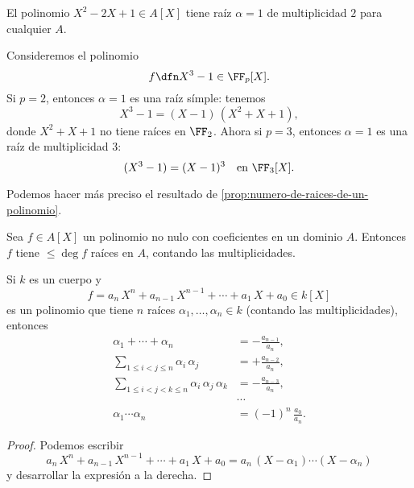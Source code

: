 \begin{ejemplo}
  El polinomio $X^2 - 2X + 1 \in A [X]$ tiene raíz $\alpha = 1$ de multiplicidad
  $2$ para cualquier $A$.
\end{ejemplo}

\begin{ejemplo}
  \label{ejemplo:X3-1}
  Consideremos el polinomio
  $$f \dfn X^3 - 1 \in \FF_p [X].$$
  Si $p = 2$, entonces $\alpha = 1$ es una raíz símple: tenemos
  $$X^3 - 1 = (X - 1)\,(X^2 + X + 1),$$
  donde $X^2 + X + 1$ no tiene raíces en $\FF_2$. Ahora si $p = 3$, entonces
  $\alpha = 1$ es una raíz de multiplicidad $3$:
  \[ (X^3 - 1) = (X-1)^3 \quad\text{en }\FF_3 [X]. \qedhere \]
\end{ejemplo}

Podemos hacer más preciso el resultado de
\ref{prop:numero-de-raices-de-un-polinomio}.

\begin{observacionejerc}
  Sea $f\in A [X]$ un polinomio no nulo con coeficientes en un dominio
  $A$. Entonces $f$ tiene $\le \deg f$ raíces en $A$, contando las
  multiplicidades.
\end{observacionejerc}

\begin{proposicion}
  Si $k$ es un cuerpo y
  $$f = a_n\,X^n + a_{n-1}\,X^{n-1} + \cdots + a_1\,X + a_0 \in k [X]$$
  es un polinomio que tiene $n$ raíces $\alpha_1,\ldots,\alpha_n \in k$
  (contando las multiplicidades), entonces
  \begin{align*}
    \alpha_1 + \cdots + \alpha_n & = -\frac{a_{n-1}}{a_n},\\
    \sum_{1 \le i < j \le n} \alpha_i\,\alpha_j & = +\frac{a_{n-2}}{a_n},\\
    \sum_{1 \le i < j < k \le n} \alpha_i\,\alpha_j\,\alpha_k & = -\frac{a_{n-3}}{a_n},\\
                                 & \cdots \\
    \alpha_1\cdots\alpha_n & = (-1)^n\,\frac{a_0}{a_n}.
  \end{align*}

  \begin{proof}
    Podemos escribir
    $$a_n\,X^n + a_{n-1}\,X^{n-1} + \cdots + a_1\,X + a_0 = a_n\,(X-\alpha_1)\cdots (X-\alpha_n)$$
    y desarrollar la expresión a la derecha.
  \end{proof}
\end{proposicion}

